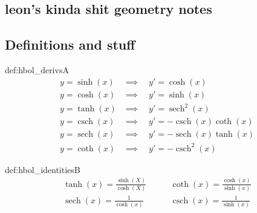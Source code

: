 \documentclass[landscape, 8pt]{extarticle}
\DeclareMathOperator{\sech}{sech}
\DeclareMathOperator{\csch}{csch}
\begin{document}
\setlength{\abovedisplayskip}{3.5pt}
\setlength{\belowdisplayskip}{3.5pt}
\setlength{\abovedisplayshortskip}{3.5pt}
\setlength{\belowdisplayshortskip}{3.5pt}

\begin{multicols}{3}
\raggedcolumns %
\section{\huge leon's kinda shit geometry notes}
\vspace{-5pt}

\subsection*{Definitions and stuff}

\begin{dfn}{def:hbol_derivs}{A}
    \begin{align*}
        y = \sinh(x) & \implies \quad y' = \cosh(x) \\
        y = \cosh(x) & \implies \quad y' = \sinh(x) \\
        y = \tanh(x) & \implies \quad y' = \sech^{2}(x) \\
        y = \csch(x) & \implies \quad y' = -\csch(x)\coth(x) \\
        y = \sech(x) & \implies \quad y' = -\sech(x)\tanh(x) \\
        y = \coth(x) & \implies \quad y' = -\csch^{2}(x)
    \end{align*}
\end{dfn}
\vspace{-5pt}

\begin{dfn}{def:hbol_identities}{B}
    \begin{align*}
        \tanh(x) = \frac{\sinh(X)}{\cosh(X)} & \qquad \coth(x) = \frac{\cosh(x)}{\sinh(x)} \\
        \sech(x) = \frac{1}{\cosh(x)} & \qquad \csch(x) = \frac{1}{\sinh(x)}
    \end{align*}
\end{dfn}
\vspace{-5pt}


\end{multicols}
\end{document}
